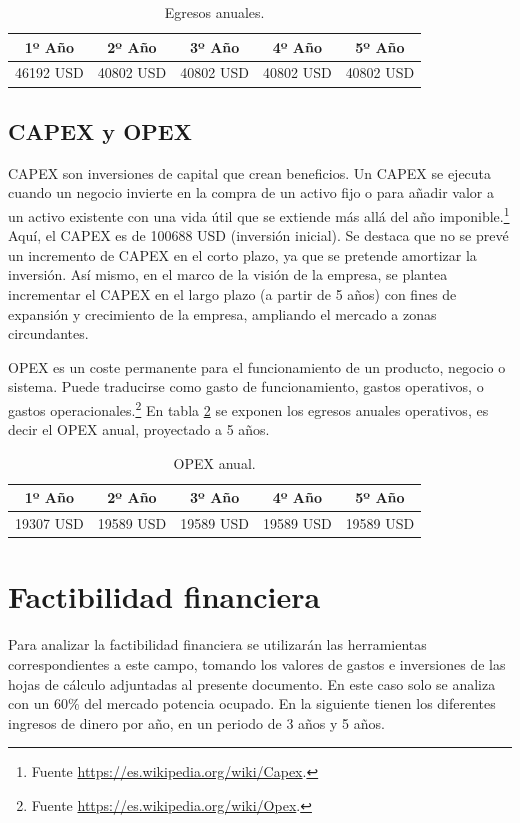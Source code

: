 \documentclass[12pt,a4paper]{book}
\begin{document}
\begin{table} [H]
\centering
\begin{tabular}{|c|c|c|c|c|}
\hline
1º Año & 2º Año & 3º Año & 4º Año & 5º Año \\
\hline
46192 USD & 40802 USD & 40802 USD & 40802 USD & 40802 USD \\ 
\hline
\end{tabular}

\caption{Egresos anuales.}
\label{Tabla_egresos_Pnegocio}
\end{table}


\subsection{CAPEX y OPEX}

CAPEX son inversiones de capital que crean beneficios. Un CAPEX se ejecuta cuando un negocio invierte en la compra de un activo fijo o para añadir valor a un activo existente con una vida útil que se extiende más allá del año imponible.\footnote{Fuente \url{https://es.wikipedia.org/wiki/Capex}.} Aquí, el CAPEX es de 100688 USD (inversión inicial). Se destaca que no se prevé un incremento de CAPEX en el corto plazo, ya que se pretende amortizar la inversión. Así mismo, en el marco de la visión de la empresa, se plantea incrementar el CAPEX en el largo plazo (a partir de 5 años) con fines de expansión y crecimiento de la empresa, ampliando el mercado a zonas circundantes. 

\medskip

OPEX es un coste permanente para el funcionamiento de un producto, negocio o sistema. Puede traducirse como gasto de funcionamiento, gastos operativos, o gastos operacionales.\footnote{Fuente \url{https://es.wikipedia.org/wiki/Opex}.} En tabla \ref{Tabla_OPEX_Pnegocio} se exponen los egresos anuales operativos, es decir el OPEX anual, proyectado a 5 años.

\begin{table} [H]
\centering
\begin{tabular}{|c|c|c|c|c|}
\hline
1º Año & 2º Año & 3º Año & 4º Año & 5º Año \\
\hline
19307 USD & 19589 USD & 19589 USD & 19589 USD & 19589 USD \\ 
\hline
\end{tabular}

\caption{OPEX anual.}
\label{Tabla_OPEX_Pnegocio}
\end{table}

\section{Factibilidad financiera}
Para analizar la factibilidad financiera se utilizarán las herramientas correspondientes a este campo, tomando los valores de gastos e inversiones de las hojas de cálculo adjuntadas al presente documento. En este caso solo se analiza con un 60\% del mercado potencia ocupado.
En la siguiente tienen los diferentes ingresos de dinero por año, en un periodo de 3 años y 5 años. 
\end{document}

